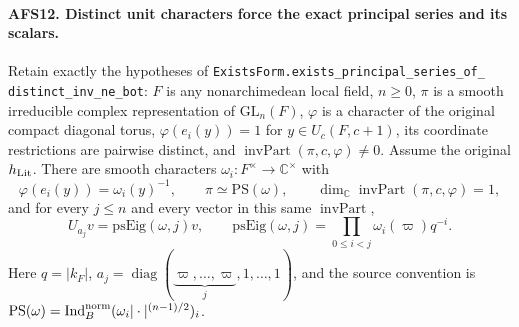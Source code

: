 \documentclass[11pt,a4paper]{article}
\numberwithin{equation}{section}
\theoremstyle{remark}\newtheorem{remark}[theorem]{Remark}
\begin{document}
\paragraph{AFS12. Distinct unit characters force the exact principal series and its scalars.}
\label{claim:AFS12}
Retain exactly the hypotheses of
\texttt{Exists\allowbreak Form.\allowbreak exists\_\allowbreak principal\_\allowbreak series\_\allowbreak of\_\allowbreak
distinct\_\allowbreak inv\_\allowbreak ne\_\allowbreak bot}:
$F$ is any nonarchimedean local field, $n\geq0$, $\pi$ is a
smooth irreducible complex representation of
$\mathrm{GL}_n(F)$, $\varphi$ is a character of the original
compact diagonal torus, $\varphi(e_i(y))=1$ for
$y\in U_c(F,c+1)$, its coordinate restrictions are pairwise
distinct, and $\operatorname{invPart}(\pi,c,\varphi)\ne0$.
Assume the original $h_{\rm Lit}$.
There are smooth characters $\omega_i:F^\times\to\mathbb C^\times$
with
\[
 \varphi(e_i(y))=\omega_i(y)^{-1},\qquad
 \pi\simeq\mathrm{PS}(\omega),\qquad
 \dim_{\mathbb C}\operatorname{invPart}(\pi,c,\varphi)=1,
\]
and for every $j\leq n$ and every vector in this same
$\operatorname{invPart}$,
\begin{equation}\label{eq:afs-pseig}
 U_{a_j}v=\mathrm{psEig}(\omega,j)v,
 \qquad
 \mathrm{psEig}(\omega,j)=\prod_{0\leq i<j}
                   \omega_i(\varpi)q^{-i}.
\end{equation}
Here $q=|k_F|$, $a_j=\operatorname{diag}
(\underbrace{\varpi,\ldots,\varpi}_{j},1,\ldots,1)$,
and the source convention is
$\mathrm{PS}(\omega)=\operatorname{Ind}^{\rm norm}_B
(\omega_i|\cdot|^{(n-1)/2})_i$.
\end{document}
